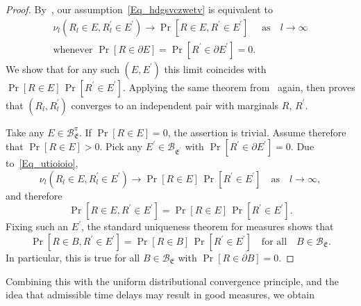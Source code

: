 \documentclass[10pt]{amsart}
\theoremstyle{definition}\newtheorem{defi}[theo]{Definition}\newtheorem{rema}[theo]{Remark}\newtheorem{exam}[theo]{Example}\newtheorem{exem}[theo]{Example}\newtheorem{nota}[theo]{Notation}
\newcommand{\clB}{\mathcal{B}}
\newcommand{\frkE}{\mathfrak{E}}
\begin{document}
\begin{proof}
By~\cite[Theorem~2.8]{Bi}, our assumption~\eqref{Eq_hdgsvczwetv} is equivalent to
\begin{equation}\label{Eq_hjgkhjkhjkfkhjkgfkhjkgfjh}
\begin{gathered}
\nu_{l}\left(R_{l}\in E,R_{l}^{\prime}\in E^{\prime}\right)\longrightarrow\Pr[R\in E,R^{\prime}\in E^{\prime}]\quad\text{ as}\quad l\rightarrow\infty
\\
\text{whenever }\Pr\left[R\in\partial E\right]=\Pr\left[R^{\prime}\in\partial E^{\prime}\right]=0 . 
\end{gathered}
\end{equation}
We show that for any such $(E,E^{\prime})$ this limit coincides with $\Pr[R\in E]\,\Pr[R^{\prime}\in E^{\prime}]$. Applying the same theorem from~\cite{Bi} again, then proves that $(R_{l},R_{l}^{\prime})$ converges to an independent pair with marginals $R$, $R^{\prime}$.

Take any $E\in\clB_{\frkE}^{\pi}$. If $\Pr[R\in E]=0$, the assertion is trivial. Assume therefore that $\Pr[R\in E]>0$. Pick any $E^{\prime}\in\clB_{\frkE^{\prime}}$ with $\Pr[R^{\prime}
\in\partial E^{\prime}]=0$. Due to~\eqref{Eq_utioioio},
\[
\nu_{l}\left(R_{l}\in E,R_{l}^{\prime}\in E^{\prime}\right)\longrightarrow\Pr[R\in E]\,\Pr\left[R^{\prime}\in E^{\prime}\right]\quad\text{as}\quad l\rightarrow\infty,
\]
and therefore
\[
\Pr\left[R\in E,R^{\prime}\in E^{\prime}\right]=\Pr[R\in E]\,\Pr\left[R^{\prime}\in E^{\prime}\right].
\]
Fixing such an $E^{\prime}$, the standard uniqueness theorem for measures shows that
\[
\Pr\left[R\in B,R^{\prime}\in E^{\prime}\right]=\Pr[R\in B]\,\Pr\left[R^{\prime}\in E^{\prime }\right]\quad\text{for all}\quad B\in\clB_{\frkE}.
\]
In particular, this is true for all $B\in\clB_{\frkE}$ with $\Pr[R\in\partial B]=0$.
\end{proof}


Combining this with the uniform distributional convergence principle, and the idea that admissible time delays may result in good measures, we obtain
\end{document}
